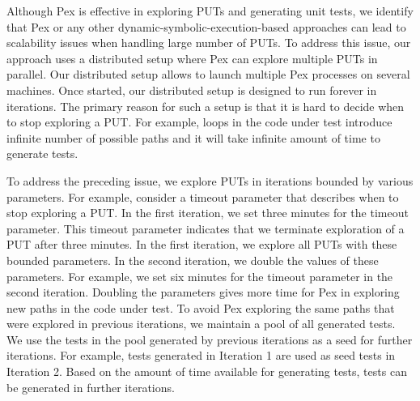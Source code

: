 Although Pex is effective in exploring PUTs and generating unit tests,
we identify that Pex or any other dynamic-symbolic-execution-based approaches
can lead to scalability issues when handling large number 
of PUTs. To address this issue, our approach uses a distributed 
setup where Pex can explore multiple PUTs in parallel. Our distributed
setup allows to launch multiple Pex processes on several machines.
Once started, our distributed setup is designed to run forever in iterations. 
The primary reason for such a setup is that it is hard to 
decide when to stop exploring a PUT. For example, loops in the
code under test introduce infinite number of possible paths and 
it will take infinite amount of time to generate tests.

To address the preceding issue, we explore PUTs in iterations bounded by
various parameters. For example, consider a timeout parameter that describes
when to stop exploring a PUT. In the first iteration, we set three minutes
for the timeout parameter. This timeout parameter indicates that we terminate
exploration of a PUT after three minutes. In the first iteration, we explore all PUTs with
these bounded parameters. In the second iteration, we double the values
of these parameters. For example, we set six minutes for the timeout parameter
in the second iteration. Doubling the parameters gives more time for
Pex in exploring new paths in the code under test. 
To avoid Pex exploring the same paths that were explored in previous iterations, we 
maintain a pool of all generated tests. We use the tests in the pool generated
by previous iterations as a seed for further iterations.
For example, tests generated in Iteration 1 are used as seed tests in Iteration 2. 
Based on the amount of time available for generating tests,
tests can be generated in further iterations.
